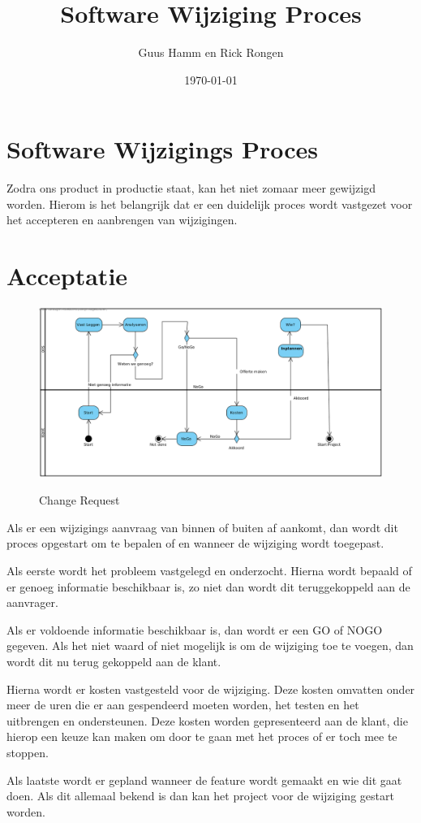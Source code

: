 \documentclass{scrreprt}
\title{Software Wijziging Proces}
\author{Guus Hamm en Rick Rongen}
\date{\today}
\begin{document}
	\maketitle
	\tableofcontents
	\newpage
	\chapter{Software Wijzigings Proces}
		Zodra ons product in productie staat, kan het niet zomaar meer gewijzigd worden. Hierom is het belangrijk dat er een duidelijk proces wordt vastgezet voor het accepteren en aanbrengen van wijzigingen.
	
	\chapter{Acceptatie}
	\begin{figure}[ht]
		\centering
		\includegraphics[width=\linewidth]{change-request}
		\label{fig:change-request}
		\caption{Change Request}
	\end{figure}
		Als er een wijzigings aanvraag van binnen of buiten af aankomt, dan wordt dit proces opgestart om te bepalen of en wanneer de wijziging wordt toegepast.\par
		
		Als eerste wordt het probleem vastgelegd en onderzocht. Hierna wordt bepaald of er genoeg informatie beschikbaar is, zo niet dan wordt dit teruggekoppeld aan de aanvrager.\par
		Als er voldoende informatie beschikbaar is, dan wordt er een GO of NOGO gegeven. Als het niet waard of niet mogelijk is om de wijziging toe te voegen, dan wordt dit nu terug gekoppeld aan de klant.\par
		Hierna wordt er kosten vastgesteld voor de wijziging. Deze kosten omvatten onder meer de uren die er aan gespendeerd moeten worden, het testen en het uitbrengen en ondersteunen. Deze kosten worden gepresenteerd aan de klant, die hierop een keuze kan maken om door te gaan met het proces of er toch mee te stoppen.\par
		Als laatste wordt er gepland wanneer de feature wordt gemaakt en wie dit gaat doen. Als dit allemaal bekend is dan kan het project voor de wijziging gestart worden.
\end{document}
